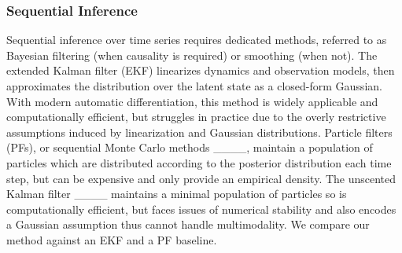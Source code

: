 \subsubsection{Sequential Inference}
Sequential inference over time series requires dedicated methods, referred to as Bayesian filtering (when causality is required) or smoothing (when not). The extended Kalman filter (EKF) linearizes dynamics and observation models, then approximates the distribution over the latent state as a closed-form Gaussian. With modern automatic differentiation, this method is widely applicable and computationally efficient, but struggles in practice due to the overly restrictive assumptions induced by linearization and Gaussian distributions. Particle filters (PFs), or sequential Monte Carlo methods ____, maintain a population of particles which are distributed according to the posterior distribution each time step, but can be expensive and only provide an empirical density. The unscented Kalman filter ____ maintains a minimal population of particles so is computationally efficient, but faces issues of numerical stability and also encodes a Gaussian assumption thus cannot handle multimodality. We compare our method against an EKF and a PF baseline.